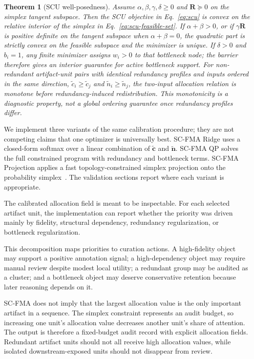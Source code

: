 \documentclass[a4paper,fleqn]{cas-sc}
\newtheorem{theorem}{Theorem}[section]
\begin{document}
\begin{theorem}[SCU well-posedness]
\label{thm:scu-well-posedness}
Assume $\alpha,\beta,\gamma,\delta \ge 0$ and $\mathbf{R}\succeq 0$ on the simplex tangent subspace. Then the SCU objective in Eq.~\ref{eq:scu} is convex on the relative interior of the simplex in Eq.~\ref{eq:scu-feasible-set}. If $\alpha+\beta>0$, or if $\gamma\mathbf{R}$ is positive definite on the tangent subspace when $\alpha+\beta=0$, the quadratic part is strictly convex on the feasible subspace and the minimizer is unique. If $\delta>0$ and $b_i=1$, any finite minimizer assigns $w_i>0$ to that bottleneck node; the barrier therefore gives an interior guarantee for active bottleneck support. For non-redundant artifact-unit pairs with identical redundancy profiles and inputs ordered in the same direction, $\tilde c_i\ge \tilde c_j$ and $\tilde n_i\ge \tilde n_j$, the two-input allocation relation is monotone before redundancy-induced redistribution. This monotonicity is a diagnostic property, not a global ordering guarantee once redundancy profiles differ.
\end{theorem}

We implement three variants of the same calibration procedure; they are not competing claims that one optimizer is universally best. SC-FMA Ridge uses a closed-form softmax over a linear combination of $\tilde{\mathbf{c}}$ and $\tilde{\mathbf{n}}$. SC-FMA QP solves the full constrained program with redundancy and bottleneck terms. SC-FMA Projection applies a fast topology-constrained simplex projection onto the probability simplex~\cite{wang2013projection}. The validation sections report where each variant is appropriate.

The calibrated allocation field is meant to be inspectable. For each selected artifact unit, the implementation can report whether the priority was driven mainly by fidelity, structural dependency, redundancy regularization, or bottleneck regularization.

This decomposition maps priorities to curation actions. A high-fidelity object may support a positive annotation signal; a high-dependency object may require manual review despite modest local utility; a redundant group may be audited as a cluster; and a bottleneck object may deserve conservative retention because later reasoning depends on it.

SC-FMA does not imply that the largest allocation value is the only important artifact in a sequence. The simplex constraint represents an audit budget, so increasing one unit's allocation value decreases another unit's share of attention. The output is therefore a fixed-budget audit record with explicit allocation fields. Redundant artifact units should not all receive high allocation values, while isolated downstream-exposed units should not disappear from review.
\end{document}
